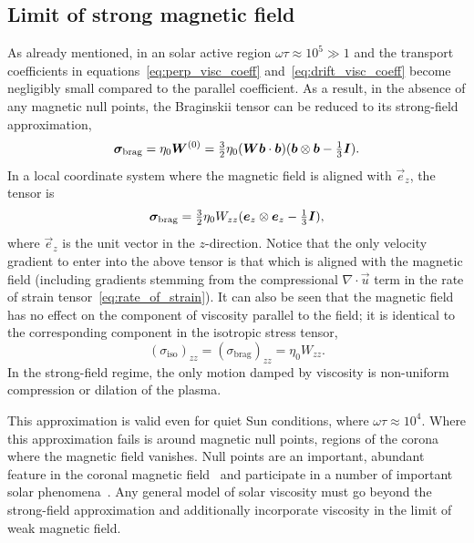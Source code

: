 \subsection{Limit of strong magnetic field}

As already mentioned, in an solar active region $\omega \tau \approx 10^5 \gg 1$ and the transport coefficients in equations~\eqref{eq:perp_visc_coeff} and~\eqref{eq:drift_visc_coeff} become negligibly small compared to the parallel coefficient. As a result, in the absence of any magnetic null points, the Braginskii tensor can be reduced to its strong-field approximation,
\begin{equation}
  \label{eq:strong_field_approx}
{\bm \sigma}_{\text{brag}} = \eta_0 {\bm W}^{(0)} = \tfrac{3}{2} \eta_0 ({\bm W} {\bm b} \cdot {\bm b}) ( {\bm b} \otimes {\bm b} - \tfrac{1}{3} {\bm I}).
\end{equation}
In a local coordinate system where the magnetic field is aligned with $\vec{e}_z$, the tensor is
\begin{equation}
  \label{eq:z_aligned_strong_field_approx}
{\bm \sigma}_{\text{brag}} = \tfrac{3}{2} \eta_0 W_{zz} ( {\bm e}_z \otimes {\bm e}_z - \tfrac{1}{3} {\bm I}),
\end{equation}
where $\vec{e}_z$ is the unit vector in the $z$-direction. Notice that the only velocity gradient to enter into the above tensor is that which is aligned with the magnetic field (including gradients stemming from the compressional $\nabla \cdot \vec{u}$ term in the rate of strain tensor~\eqref{eq:rate_of_strain}). It can also be seen that the magnetic field has no effect on the component of viscosity parallel to the field; it is identical to the corresponding component in the isotropic stress tensor,
\begin{equation}
  \label{eq:z_aligned_iso}
  (\sigma_{\text{iso}})_{zz} = (\sigma_{\text{brag}})_{zz} = \eta_0 W_{zz}.
\end{equation}
In the strong-field regime, the only motion damped by viscosity is non-uniform compression or dilation of the plasma. 

This approximation is valid even for quiet Sun conditions, where $\omega\tau \approx 10^4$. Where this approximation fails is around magnetic null points, regions of the corona where the magnetic field vanishes. Null points are an important, abundant feature in the coronal magnetic field~\cite{edwardsNullPointDistribution2015} and participate in a number of important solar phenomena~\cite{massonNATUREFLARERIBBONS2009,moreno-insertisPLASMAJETSERUPTIONS2013,barnesRelationshipCoronalMagnetic2007}. Any general model of solar viscosity must go beyond the strong-field approximation and additionally incorporate viscosity in the limit of weak magnetic field.

